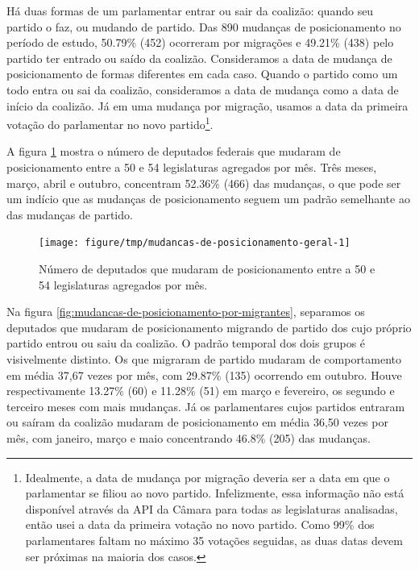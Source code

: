 \documentclass[a4paper,titlepage]{ppgi}\usepackage[]{graphicx}\usepackage[]{color}
\newenvironment{knitrout}{}{} %
\begin{document}
Há duas formas de um parlamentar entrar ou sair da coalizão: quando seu partido
o faz, ou mudando de partido. Das 890 mudanças de
posicionamento no período de estudo,
50.79\% (452)
ocorreram por migrações e
49.21\% (438)
pelo partido ter entrado ou saído da coalizão. Consideramos a data de mudança
de posicionamento de formas diferentes em cada caso. Quando o partido como um
todo entra ou sai da coalizão, consideramos a data de mudança como a data de
início da coalizão. Já em uma mudança por migração, usamos a data da primeira
votação do parlamentar no novo partido\footnote{Idealmente, a data de mudança
por migração deveria ser a data em que o parlamentar se filiou ao novo partido.
Infelizmente, essa informação não está disponível através da \gls{API} da
Câmara para todas as legislaturas analisadas, então usei a data da primeira
votação no novo partido. Como 99\% dos parlamentares faltam no máximo 35
votações seguidas, as duas datas devem ser próximas na maioria dos casos.}.

A figura \ref{fig:mudancas-de-posicionamento-geral} mostra o número de
deputados federais que mudaram de posicionamento entre a 50\textordfeminine{} e
54\textordfeminine{} legislaturas agregados por mês. Três meses, março, abril e
outubro, concentram
52.36\%
(466) das mudanças, o que pode
ser um indício que as mudanças de posicionamento seguem um padrão semelhante ao
das mudanças de partido.

\begin{knitrout}
\color{fgcolor}\begin{figure}
\texttt{[image: figure/tmp/mudancas-de-posicionamento-geral-1]} \caption[Número de deputados que mudaram de posicionamento entre a 50\textordfeminine{} e 54\textordfeminine{} legislaturas agregados por mês]{Número de deputados que mudaram de posicionamento entre a 50\textordfeminine{} e 54\textordfeminine{} legislaturas agregados por mês.}\label{fig:mudancas-de-posicionamento-geral}
\end{figure}


\end{knitrout}

Na figura \ref{fig:mudancas-de-posicionamento-por-migrantes}, separamos os
deputados que mudaram de posicionamento migrando de partido dos cujo próprio
partido entrou ou saiu da coalizão. O padrão temporal dos dois grupos é
visivelmente distinto. Os que migraram de partido mudaram de comportamento em
média 37,67 vezes por mês, com
29.87\%
(135) ocorrendo em outubro. Houve respectivamente
13.27\%
(60) e
11.28\%
(51) em março e fevereiro, os segundo e terceiro
meses com mais mudanças. Já os parlamentares cujos partidos entraram ou saíram
da coalizão mudaram de posicionamento em média
36,50 vezes por mês, com janeiro, março e
maio concentrando
46.8\%
(205) das mudanças.
\end{document}
